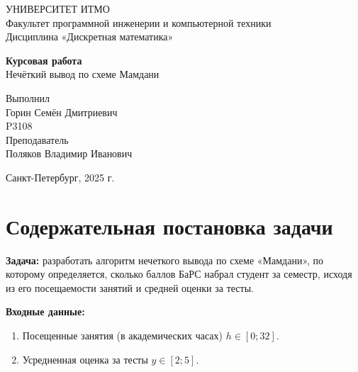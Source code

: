 \documentclass{article}
\begin{document}
\begin{center}
    УНИВЕРСИТЕТ ИТМО \\
    Факультет программной инженерии и компьютерной техники \\
    Дисциплина «Дискретная математика»
    
    \vspace{5cm}
    
    \large
    \textbf{Курсовая работа} \\
    Нечёткий вывод по схеме Мамдани
\end{center}

\vspace{10cm}

\hfill\begin{minipage}{0.35\linewidth}
Выполнил \\
Горин Семён Дмитриевич \\
P3108 \\

Преподаватель \\
Поляков Владимир Иванович
\end{minipage}

\vfill

\begin{center}
    Санкт-Петербург, 2025 г.
\end{center}

\thispagestyle{empty}
\newpage

\tableofcontents
\newpage

\section{Содержательная постановка задачи}

\textbf{Задача:} разработать алгоритм нечеткого вывода по схеме «Мамдани», по которому определяется, сколько баллов БаРС набрал студент за семестр, исходя из его посещаемости занятий и средней оценки за тесты.

\medskip

\textbf{Входные данные:}
\begin{enumerate}
    \item Посещенные занятия (в академических часах) $h \in [0;32]$.
    \item Усредненная оценка за тесты $y \in [2;5]$.
\end{enumerate}
\end{document}
